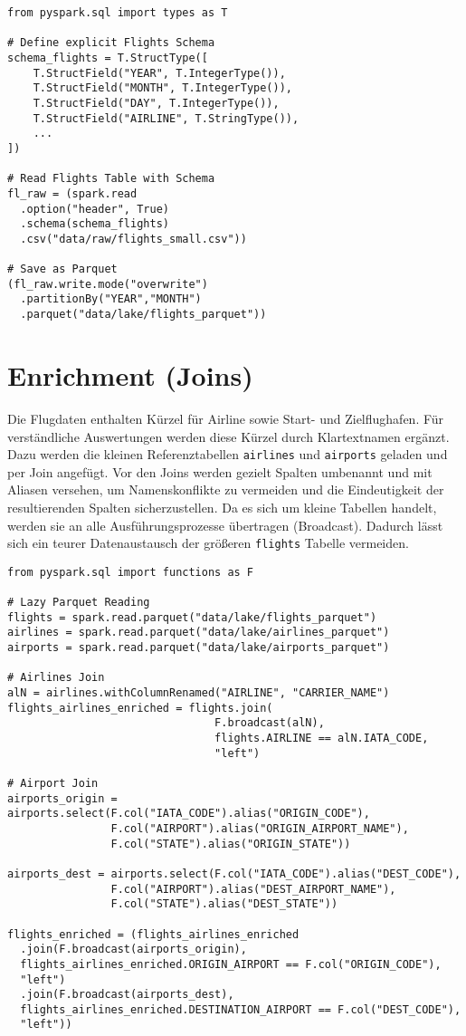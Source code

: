 \documentclass[a4paper,11pt]{article}
\begin{document}
\begin{verbatim}
from pyspark.sql import types as T

# Define explicit Flights Schema
schema_flights = T.StructType([
    T.StructField("YEAR", T.IntegerType()), 
    T.StructField("MONTH", T.IntegerType()),
    T.StructField("DAY", T.IntegerType()),
    T.StructField("AIRLINE", T.StringType()),
    ...
])

# Read Flights Table with Schema
fl_raw = (spark.read
  .option("header", True)
  .schema(schema_flights)
  .csv("data/raw/flights_small.csv"))

# Save as Parquet
(fl_raw.write.mode("overwrite")
  .partitionBy("YEAR","MONTH")
  .parquet("data/lake/flights_parquet"))
\end{verbatim}

\section{Enrichment (Joins)}
Die Flugdaten enthalten Kürzel für Airline sowie Start- und Zielflughafen. Für verständliche Auswertungen werden diese Kürzel durch Klartextnamen ergänzt. Dazu werden die kleinen Referenztabellen \texttt{airlines} und \texttt{airports} geladen und per Join angefügt. Vor den Joins werden gezielt Spalten umbenannt und mit Aliasen versehen, um Namenskonflikte zu vermeiden und die Eindeutigkeit der resultierenden Spalten sicherzustellen. Da es sich um kleine Tabellen handelt, werden sie an alle Ausführungsprozesse übertragen (Broadcast). Dadurch lässt sich ein teurer Datenaustausch der größeren \texttt{flights} Tabelle vermeiden.

\begin{verbatim}
from pyspark.sql import functions as F

# Lazy Parquet Reading
flights = spark.read.parquet("data/lake/flights_parquet")
airlines = spark.read.parquet("data/lake/airlines_parquet")
airports = spark.read.parquet("data/lake/airports_parquet")

# Airlines Join
alN = airlines.withColumnRenamed("AIRLINE", "CARRIER_NAME")
flights_airlines_enriched = flights.join(
                                F.broadcast(alN), 
                                flights.AIRLINE == alN.IATA_CODE, 
                                "left")

# Airport Join
airports_origin = airports.select(F.col("IATA_CODE").alias("ORIGIN_CODE"),
                F.col("AIRPORT").alias("ORIGIN_AIRPORT_NAME"),
                F.col("STATE").alias("ORIGIN_STATE"))

airports_dest = airports.select(F.col("IATA_CODE").alias("DEST_CODE"),
                F.col("AIRPORT").alias("DEST_AIRPORT_NAME"),
                F.col("STATE").alias("DEST_STATE"))

flights_enriched = (flights_airlines_enriched
  .join(F.broadcast(airports_origin), 
  flights_airlines_enriched.ORIGIN_AIRPORT == F.col("ORIGIN_CODE"), 
  "left")
  .join(F.broadcast(airports_dest), 
  flights_airlines_enriched.DESTINATION_AIRPORT == F.col("DEST_CODE"), 
  "left"))

\end{verbatim}
\end{document}
